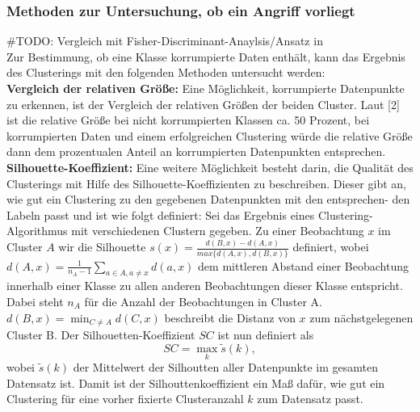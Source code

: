 \documentclass[11pt,a4paper]{article}
\numberwithin{equation}{section}
\begin{document}
	
	\subsubsection{Methoden zur Untersuchung, ob ein Angriff vorliegt}
	\#TODO: Vergleich mit Fisher-Discriminant-Anaylsis/Ansatz in \cite{imagenet_unhansed_v1}\\
	
	Zur
	Bestimmung, ob eine Klasse korrumpierte Daten enthält, kann das Ergebnis
	des Clusterings mit den folgenden Methoden untersucht werden:\\
	
	\noindent \textbf{Vergleich der relativen Größe:} Eine Möglichkeit, korrumpierte Datenpunkte
	zu erkennen, ist der Vergleich der relativen Größen der beiden Cluster. Laut [2]
	ist die relative Größe bei nicht korrumpierten Klassen ca. 50 Prozent, bei korrumpierten Daten und einem erfolgreichen Clustering würde die relative Größe
	dann dem prozentualen Anteil an korrumpierten Datenpunkten entsprechen.\\
	
	\noindent \textbf{Silhouette-Koeffizient:} Eine weitere Möglichkeit besteht darin, die Qualität
	des Clusterings mit Hilfe des Silhouette-Koeffizienten zu beschreiben. Dieser gibt
	an, wie gut ein Clustering zu den gegebenen Datenpunkten mit den entsprechen-
	den Labeln passt und ist wie folgt definiert: Sei das Ergebnis eines Clustering-
	Algorithmus mit verschiedenen Clustern gegeben. Zu einer Beobachtung $x$ im Cluster $A$ wir die Silhouette $s(x) = \frac{d(B,x)-d(A,x)}{max\lbrace d(A,x), d(B,x) \rbrace}$ definiert, wobei $d(A,x)  = \frac{1}{n_A -1}\sum_{a \in A, a \neq x}{d(a,x)}$ dem mittleren Abstand einer Beobachtung innerhalb einer Klasse zu allen anderen Beobachtungen dieser Klasse entspricht.
	Dabei steht $n_A$ für die Anzahl der Beobachtungen in Cluster A. $d(B,x) = \min_{C \neq A}d(C,x)$ beschreibt die Distanz von $x$ zum nächstgelegenen Cluster B. Der Silhouetten-Koeffizient $SC$ ist nun definiert als
	\begin{equation}
	SC = \max_k \tilde{s}(k),
	\end{equation}
	wobei $\tilde{s}(k)$ der Mittelwert der Silhoutten aller Datenpunkte im gesamten Datensatz ist. Damit ist der Silhouttenkoeffizient ein Maß dafür, wie gut ein Clustering für eine vorher fixierte Clusteranzahl $k$ zum Datensatz passt.\\
	
\end{document}
